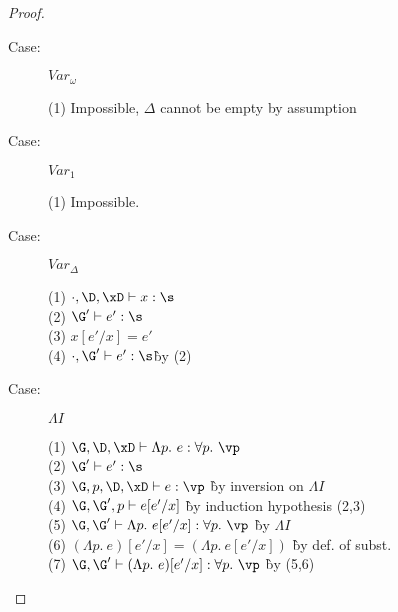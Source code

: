 \begin{proof}
\begin{description}
\item[Case:] $Var_\omega$
\begin{tabbing}
    (1) Impossible, $\Delta$ cannot be empty by assumption\\
\end{tabbing}

\item[Case:] $Var_1$
\begin{tabbing}
    (1) Impossible.
\end{tabbing}

\item[Case:] $Var_\Delta$
\begin{tabbing}
    (1) $\cdot, \D, \xD \vdash x : \s$\\
    (2) $\G' \vdash e' : \s$\\
    (3) $x[e'/x] = e'$\\
    (4) $\cdot, \G' \vdash e' : \s$\` by (2)\\
\end{tabbing}

\item[Case:] $\Lambda I$
\begin{tabbing}
    (1) $\G,\D, \xD \vdash \Lambda p.~e : \forall p.~\vp$\\
    (2) $\G' \vdash e' : \s$\\
    (3) $\G, p, \D, \xD \vdash e : \vp$ \` by inversion on $\Lambda I$\\
    (4) $\G, \G', p \vdash e[e'/x]$ \` by induction hypothesis (2,3)\\
    (5) $\G, \G' \vdash \Lambda p.~e[e'/x] : \forall p.~\vp$ \` by $\Lambda I$ \\
    (6) $(\Lambda p.~e)[e'/x] = (\Lambda p.~e[e'/x])$ \` by def. of subst.\\
    (7) $\G, \G' \vdash (\Lambda p.~e)[e'/x] : \forall p.~\vp$ \` by (5,6)\\
\end{tabbing}


\end{description}
\end{proof}
